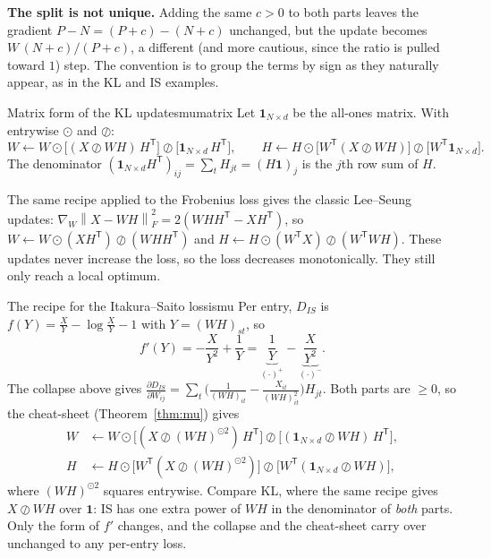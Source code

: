 \documentclass[11pt]{article}
\newcommand{\one}{\symbf{1}}
\newcommand{\T}{^{\mathsf T}}
\newcommand{\Fro}[1]{\left\lVert #1\right\rVert_F}
\newcommand{\had}{\odot}
\newcommand{\hdiv}{\oslash}
\begin{document}
\begin{deeper}
\textbf{The split is not unique.} Adding the same $c>0$ to both parts leaves the gradient
$P-N=(P+c)-(N+c)$ unchanged, but the update becomes $W\,(N+c)/(P+c)$, a different (and more
cautious, since the ratio is pulled toward $1$) step. The convention is to group the terms by sign
as they naturally appear, as in the KL and IS examples.
\end{deeper}

\begin{proposition}{Matrix form of the KL updates}{mumatrix}
Let $\one_{N\times d}$ be the all-ones matrix. With entrywise $\had$ and $\hdiv$:
\[
W\leftarrow W\had\big[(X\hdiv WH)\,H\T\big]\hdiv\big[\one_{N\times d}\,H\T\big],
\qquad
H\leftarrow H\had\big[W\T(X\hdiv WH)\big]\hdiv\big[W\T\one_{N\times d}\big].
\]
The denominator $(\one_{N\times d}H\T)_{ij}=\sum_tH_{jt}=(H\one)_j$ is the $j$th row sum of $H$.
\end{proposition}

\begin{deeper}
The same recipe applied to the Frobenius loss gives the classic Lee--Seung updates:
$\nabla_W\Fro{X-WH}^2=2(WHH\T-XH\T)$, so
$W\leftarrow W\had(XH\T)\hdiv(WHH\T)$ and $H\leftarrow H\had(W\T X)\hdiv(W\T WH)$.
These updates never increase the loss, so the loss decreases monotonically. They still
only reach a local optimum.
\end{deeper}

\begin{example}{The recipe for the Itakura--Saito loss}{ismu}
Per entry, $D_{IS}$ is $f(Y)=\frac{X}{Y}-\log\frac XY-1$ with $Y=(WH)_{st}$, so
\[
f'(Y)=-\frac{X}{Y^2}+\frac1Y=\underbrace{\frac1Y}_{(\cdot)^+}-\underbrace{\frac{X}{Y^2}}_{(\cdot)^-}.
\]
The collapse above gives
$\frac{\partial D_{IS}}{\partial W_{ij}}=\sum_t\Big(\frac{1}{(WH)_{it}}-\frac{X_{it}}{(WH)_{it}^2}\Big)H_{jt}$.
Both parts are $\ge0$, so the cheat-sheet (Theorem~\ref{thm:mu}) gives
\[
\begin{aligned}
W&\leftarrow W\had\big[(X\hdiv(WH)^{\had2})\,H\T\big]\hdiv\big[(\one_{N\times d}\hdiv WH)\,H\T\big],\\
H&\leftarrow H\had\big[W\T(X\hdiv(WH)^{\had2})\big]\hdiv\big[W\T(\one_{N\times d}\hdiv WH)\big],
\end{aligned}
\]
where $(WH)^{\had2}$ squares entrywise. Compare KL, where the same recipe gives $X\hdiv WH$ over $\one$:
IS has one extra power of $WH$ in the denominator of \emph{both} parts. Only the form of $f'$ changes,
and the collapse and the cheat-sheet carry over unchanged to any per-entry loss.
\end{example}
\end{document}
